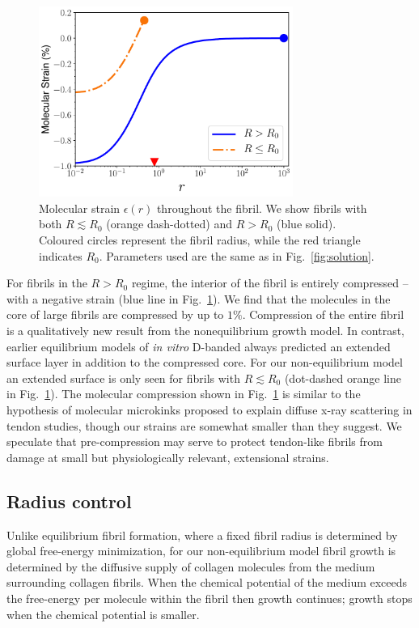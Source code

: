 \documentclass[twoside,twocolumn,9pt]{article}
\begin{document}
\begin{figure}[t!]  %
\centering
  \includegraphics[width=8.3cm]{figure4.pdf}
  \caption{Molecular strain $\epsilon(r)$ throughout the fibril. We show fibrils with both $R \lesssim R_0$ (orange dash-dotted) and $R > R_0$ (blue solid). Coloured circles represent the fibril radius, while the red triangle indicates $R_0$. Parameters used are the same as in Fig.~\ref{fig:solution}.}
  \label{fig:molecularstrain}
\end{figure}

For fibrils in the $R > R_0$ regime, the interior of the fibril is entirely compressed -- with a negative strain (blue line in Fig.~\ref{fig:molecularstrain}). We find that the molecules in the core of large fibrils are compressed by up to $1\%$. Compression of the entire fibril is a qualitatively new result from the nonequilibrium growth model. In contrast, earlier equilibrium models of \textit{in vitro} D-banded always predicted an extended surface layer in addition to the compressed core.\cite{Cameron:2020} For our non-equilibrium model an extended surface is only seen for fibrils with $R \lesssim R_0$ (dot-dashed orange line in Fig.~\ref{fig:molecularstrain}). The molecular compression shown in Fig.~\ref{fig:molecularstrain} is similar to the hypothesis of molecular microkinks proposed to explain diffuse x-ray scattering in tendon studies,\cite{Misof:1997} though our strains are somewhat smaller than they suggest. We speculate that pre-compression may serve to protect tendon-like fibrils from damage at small but physiologically relevant, extensional strains. 

\subsection{Radius control}
Unlike equilibrium fibril formation,\cite{Brown:2014, Cameron:2018, Cameron:2020} where a fixed fibril radius is determined by global free-energy minimization, for our non-equilibrium model fibril growth is determined by the diffusive supply of collagen molecules from the medium surrounding collagen fibrils.\cite{Rutenberg:2016} When the chemical potential of the medium exceeds the free-energy per molecule within the fibril then growth continues; growth stops when the chemical potential is smaller.\cite{ratchet}
\end{document}
